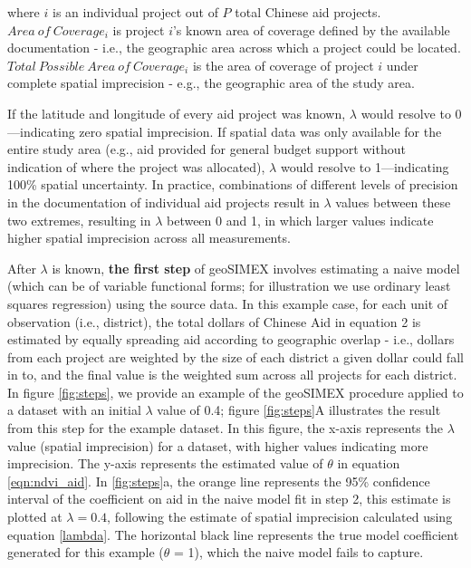 \noindent where $i$ is an individual project out of $P$ total Chinese aid projects. 
$Area \ of \ Coverage_i$ is project $i$'s known area of coverage defined by the available documentation - i.e., the geographic area across which a project could be located. 
$Total \ Possible \ Area \ of \ Coverage_i$ is the area of coverage of project $i$ under complete spatial imprecision - e.g., the geographic area of the study area.
\par
If the latitude and longitude of every aid project was known, $\lambda$ would resolve to 0---indicating zero spatial imprecision. 
If spatial data was only available for the entire study area (e.g., aid provided for general budget support without indication of where the project was allocated), $\lambda$ would resolve to 1---indicating 100\% spatial uncertainty. 
In practice, combinations of different levels of precision in the documentation of individual aid projects result in $\lambda$ values between these two extremes, resulting in $\lambda$ between 0 and 1, in which larger values indicate higher spatial imprecision across all measurements.
\par
After $\lambda$ is known, \textbf{the first step} of geoSIMEX involves estimating a naive model (which can be of variable functional forms; for illustration we use ordinary least squares regression) using the source data.
In this example case, for each unit of observation (i.e., district), the total dollars of Chinese Aid in equation 2 is estimated by equally spreading aid according to geographic overlap - i.e., dollars from each project are weighted by the size of each district a given dollar could fall in to, and the final value is the weighted sum across all projects for each district.
In figure \ref{fig:steps}, we provide an example of the geoSIMEX procedure applied to a dataset with an initial $\lambda$ value of 0.4; figure \ref{fig:steps}A illustrates the result from this step for the example dataset.
In this figure, the x-axis represents the $\lambda$ value (spatial imprecision) for a dataset, with higher values indicating more imprecision.
The y-axis represents the estimated value of $\theta$ in equation \ref{eqn:ndvi_aid}.
In \ref{fig:steps}a, the orange line represents the 95\% confidence interval of the coefficient on aid in the naive model fit in step 2, this estimate is plotted at $\lambda = 0.4$, following the estimate of spatial imprecision calculated using equation \ref{lambda}. 
The horizontal black line represents the true model coefficient generated for this example ($\theta$ = 1), which the naive model fails to capture.
